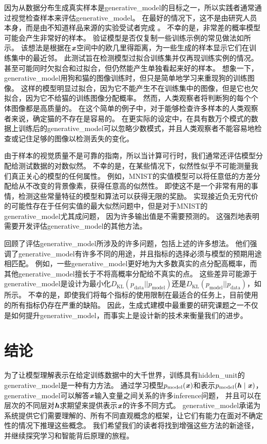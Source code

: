 因为从数据分布生成真实样本是\gls{generative_model}的目标之一，所以实践者通常通过视觉检查样本来评估\gls{generative_model}。
在最好的情况下，这不是由研究人员本身，而是由不知道样品来源的实验受试者完成 \citep{denton2015deep}。
不幸的是，非常差的概率模型可能会产生非常好的样本。
验证模型是否仅复制一些训练示例的常见做法如所示。
该想法是根据在$\boldsymbol{\mathit{x}}$空间中的欧几里得距离，为一些生成的样本显示它们在训练集中的最近邻。
此测试旨在检测模型过拟合训练集并仅再现训练实例的情况。
甚至可能同时欠拟合和过拟合，但仍然能产生单独看起来好的样本。
想象一下，\gls{generative_model}用狗和猫的图像训练时，但只是简单地学习来重现狗的训练图像。
这样的模型明显过拟合，因为它不能产生不在训练集中的图像，但是它也欠拟合，因为它不给猫的训练图像分配概率。
然而，人类观察者将判断狗的每个个体图像都是高质量的。
在这个简单的例子中，对于能够检查许多样本的人类观察者来说，确定猫的不存在是容易的。
在更实际的设定中，在具有数万个模式的数据上训练后的\gls{generative_model}可以忽略少数模式，并且人类观察者不能容易地检查或记住足够的图像以检测丢失的变化。


由于样本的视觉质量不是可靠的指南，所以当计算可行时，我们通常还评估模型分配给测试数据的对数似然。
不幸的是，在某些情况下，似然性似乎不可能测量我们真正关心的模型的任何属性。
例如，MNIST的实值模型可以将任意低的方差分配给从不改变的背景像素，获得任意高的似然性。
即使这不是一个非常有用的事情，检测这些常量特征的模型和算法可以获得无限的奖励。
实现接近负无穷代价的可能性存在于任何实值的最大似然问题中，但是对于MNIST的\gls{generative_model}尤其成问题， 因为许多输出值是不需要预测的。
这强烈地表明需要开发评估\gls{generative_model}的其他方法。


\citet{Theis2015d} 回顾了评估\gls{generative_model}所涉及的许多问题，包括上述的许多想法。
他们强调了\gls{generative_model}有许多不同的用途，并且指标的选择必须与模型的预期用途相匹配。
例如，一些\gls{generative_model}更好地为大多数真实的点分配高概率，而其他\gls{generative_model}擅长于不将高概率分配给不真实的点。
这些差异可能源于\gls{generative_model}是设计为最小化$D_{\text{KL}}(p_{\text{data}} || p_{\text{model}})$还是$D_{\text{KL}}(p_{\text{model}} || p_{\text{data}})$，如所示。
不幸的是，即使我们将每个指标的使用限制在最适合的任务上，目前使用的所有指标仍存在严重的缺陷。
因此，生成式建模中最重要的研究课题之一不仅是如何提升\gls{generative_model}，而事实上是设计新的技术来衡量我们的进步。


\section{结论}
\label{sec:conclusion}

为了让模型理解表示在给定训练数据中的大千世界，训练具有\gls{hidden_unit}的\gls{generative_model}是一种有力方法。
通过学习模型$p_{\text{model}}(\boldsymbol{\mathit{x}})$和表示$p_{\text{model}}(\boldsymbol{\mathit{h}}  \mid  \boldsymbol{\mathit{x}})$，\gls{generative_model}可以解答$\boldsymbol{\mathit{x}}$输入变量之间关系的许多\gls{inference}问题， 并且可以在层次的不同层对$\boldsymbol{\mathit{h}}$求期望来提供表示$\boldsymbol{\mathit{x}}$的许多不同方式。
\gls{generative_model}承诺为系统提供它们需要理解的、所有不同直观概念的框架，让它们有能力在面对不确定性的情况下推理这些概念。
我们希望我们的读者将找到增强这些方法的新途径，并继续探究学习和智能背后原理的旅程。
